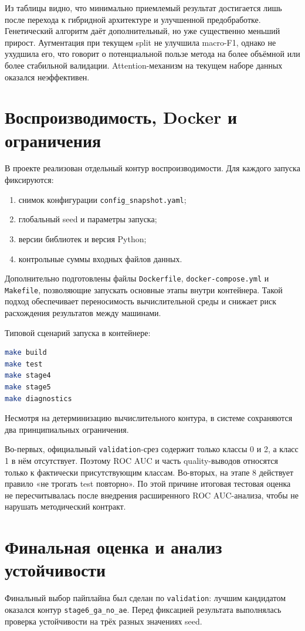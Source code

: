 \documentclass[14pt,a4paper]{extarticle}
\begin{document}
Из таблицы видно, что минимально приемлемый результат достигается лишь после перехода к гибридной архитектуре и улучшенной предобработке. Генетический алгоритм даёт дополнительный, но уже существенно меньший прирост. Аугментация при текущем split не улучшила macro-F1, однако не ухудшила его, что говорит о потенциальной пользе метода на более объёмной или более стабильной валидации. Attention-механизм на текущем наборе данных оказался неэффективен.

\section{Воспроизводимость, Docker и ограничения}\label{sec:repro}
В проекте реализован отдельный контур воспроизводимости. Для каждого запуска фиксируются:
\begin{enumerate}
    \item снимок конфигурации \texttt{config\_snapshot.yaml};
    \item глобальный seed и параметры запуска;
    \item версии библиотек и версия Python;
    \item контрольные суммы входных файлов данных.
\end{enumerate}

Дополнительно подготовлены файлы \texttt{Dockerfile}, \texttt{docker-compose.yml} и \texttt{Makefile}, позволяющие запускать основные этапы внутри контейнера. Такой подход обеспечивает переносимость вычислительной среды и снижает риск расхождения результатов между машинами.

Типовой сценарий запуска в контейнере:
\begin{lstlisting}[language=bash]
make build
make test
make stage4
make stage5
make diagnostics
\end{lstlisting}

Несмотря на детерминизацию вычислительного контура, в системе сохраняются два принципиальных ограничения.

Во-первых, официальный \texttt{validation}-срез содержит только классы 0 и 2, а класс 1 в нём отсутствует. Поэтому ROC AUC и часть quality-выводов относятся только к фактически присутствующим классам. Во-вторых, на этапе 8 действует правило «не трогать test повторно». По этой причине итоговая тестовая оценка не пересчитывалась после внедрения расширенного ROC AUC-анализа, чтобы не нарушать методический контракт.

\section{Финальная оценка и анализ устойчивости}\label{sec:final}
Финальный выбор пайплайна был сделан по \texttt{validation}: лучшим кандидатом оказался контур \texttt{stage6\_ga\_no\_ae}. Перед фиксацией результата выполнялась проверка устойчивости на трёх разных значениях seed.
\end{document}
